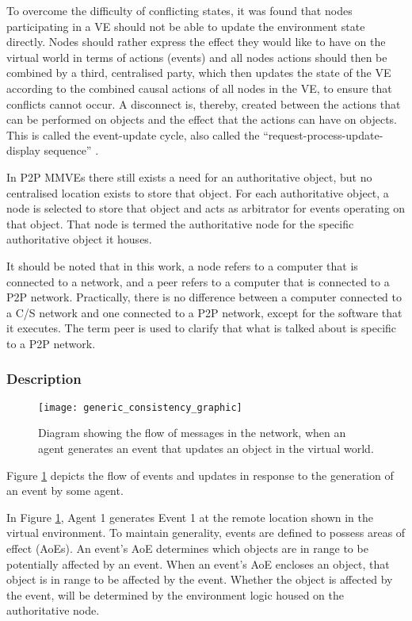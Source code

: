To overcome the difficulty of conflicting states, it was found that nodes participating in a VE should not be able to update the environment state directly. Nodes should rather express the effect they would like to have on the virtual world in terms of actions (events) and all nodes actions should then be combined by a third, centralised party, which then updates the state of the VE according to the combined causal actions of all nodes in the VE, to ensure that conflicts cannot occur. A disconnect is, thereby, created between the actions that can be performed on objects and the effect that the actions can have on objects. This is called the event-update cycle, also called the  ``request-process-update-display sequence'' \cite{Hu_voronoi_IM}.

In P2P MMVEs there still exists a need for an authoritative object, but no centralised location exists to store that object. For each authoritative object, a node is selected to store that object and acts as arbitrator for events operating on that object. That node is termed the authoritative node for the specific authoritative object it houses.

It should be noted that in this work, a node refers to a computer that is connected to a network, and a peer refers to a computer that is connected to a P2P network. Practically, there is no difference between a computer connected to a C/S network and one connected to a P2P network, except for the software that it executes. The term peer is used to clarify that what is talked about is specific to a P2P network.

\subsubsection{Description}

\begin{figure}[htbp]
 \centering
 \texttt{[image: generic\_consistency\_graphic]}
 \caption{Diagram showing the flow of messages in the network, when an agent generates an event that updates an object in the virtual world.}
 \label{fig_event_update_flow_graphic}
\end{figure}

Figure \ref{fig_event_update_flow_graphic} depicts the flow of events and updates in response to the generation of an event by some agent.

In Figure \ref{fig_event_update_flow_graphic}, Agent 1 generates Event 1 at the remote location shown in the virtual environment. To maintain generality, events are defined to possess areas of effect (AoEs). An event's AoE determines which objects are in range to be potentially affected by an event. When an event's AoE encloses an object, that object is in range to be affected by the event. Whether the object is affected by the event, will be determined by the environment logic housed on the authoritative node.

